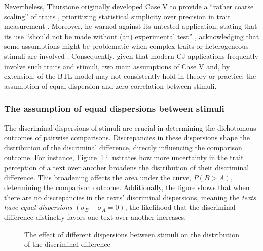 \documentclass[
  authoryear,
  preprint,
  1p]{elsarticle}
\begin{document}
Nevertheless, Thurstone originally developed Case V to provide a
``rather coarse scaling'' of traits \citep[pp.~269]{Thurstone_1927b},
prioritizing statistical simplicity over precision in trait measurement
\citep[pp.~677]{Kelly_et_al_2022}. Moreover, he warned against its
untested application, stating that its use ``should not be made without
(an) experimental test'' \citep[pp.~270]{Thurstone_1927b}, acknowledging
that some assumptions might be problematic when complex traits or
heterogeneous stimuli are involved \citep[pp.~376]{Thurstone_1927a}.
Consequently, given that modern CJ applications frequently involve such
traits and stimuli, two main assumptions of Case V and, by extension, of
the BTL model may not consistently hold in theory or practice: the
assumption of equal dispersion and zero correlation between stimuli.

\subsubsection{The assumption of equal dispersions between
stimuli}\label{the-assumption-of-equal-dispersions-between-stimuli}

The discriminal dispersions of stimuli are crucial in determining the
dichotomous outcomes of pairwise comparisons. Discrepancies in these
dispersions shape the distribution of the discriminal difference,
directly influencing the comparison outcome. For instance,
Figure~\ref{fig-dispersion} illustrates how more uncertainty in the
trait perception of a text over another broadens the distribution of
their discriminal difference. This broadening affects the area under the
curve, \(P(B>A)\), determining the comparison outcome. Additionally, the
figure shows that when there are no discrepancies in the texts'
discriminal dispersions, meaning the \emph{texts have equal dispersions}
\((\sigma_{B}-\sigma_{A}=0)\), the likelihood that the discriminal
difference distinctly favors one text over another increases.

\begin{figure}


\caption{\label{fig-dispersion}The effect of different dispersions
between stimuli on the distribution of the discriminal difference}

\end{figure}%
\end{document}
